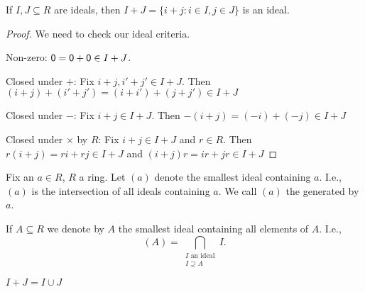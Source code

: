\documentclass[notes.tex]{subfiles}
\begin{document}
\begin{proposition}
	If $I, J\subseteq R$ are ideals, then $I+J = \{i+j: i\in I, j\in J \}$ is an ideal.
\end{proposition}
\begin{proof}
	We need to check our ideal criteria.

	Non-zero: $\mathsf{0} = \mathsf{0} + \mathsf{0} \in I+J$.

	Closed under $+$: Fix $i+j, i'+j' \in I+J$. Then $(i+j) + (i'+j') = (i+i') + (j+j') \in I+J$

	Closed under $-$: Fix $i+j\in I+J$. Then $-(i+j) = (-i)+(-j) \in I+J$

	Closed under $\times$ by $R$:
	Fix $i+j\in I+J$ and $r\in R$.
	Then $r(i+j) = ri + rj \in I+J$ and $(i+j)r = ir + jr \in I+J$
\end{proof}

\begin{defn}
	Fix an $a\in R$, $R$ a ring. Let $(a)$ denote the smallest ideal containing $a$.
	I.e., $(a)$ is the intersection of all ideals containing $a$.
	We call $(a)$ the  generated by $a$.

	If $A\subseteq R$ we denote by $A$ the smallest ideal containing all elements of $A$. I.e., \[(A) = \bigcap_{\substack{I\text{ an ideal}\\I \supseteq A}}I.\]
\end{defn}
\begin{remark}
	$I+J = I\cup J$
\end{remark}
\end{document}
